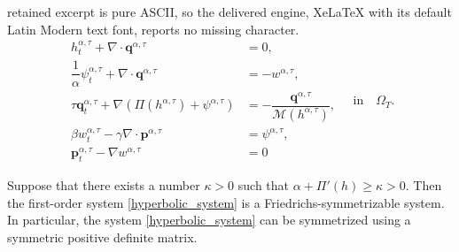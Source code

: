 \documentclass[10pt,a4paper]{amsart}
\newcommand{\rel}{^{\alpha, \tau}}
\begin{document}
retained excerpt is pure ASCII, so the delivered engine, XeLaTeX with its default Latin Modern text font, reports no missing character.
\begin{equation}\label{hyperbolic_system}
\begin{aligned}
     h^{\alpha, \tau}_t+\nabla\cdot \mathbf{q}^{\alpha, \tau}&=0,\\
     \dfrac{1}{\alpha}\psi^{\alpha, \tau}_t+\nabla\cdot \mathbf{q}^{\alpha, \tau}&=-w\rel,\\
     \tau\mathbf{q}^{\alpha, \tau}_t+\nabla(\Pi(h^{\alpha, \tau})+\psi^{\alpha, \tau})&=-\dfrac{\mathbf{q}^{\alpha, \tau}}{\mathcal{M}(h^{\alpha, \tau})},\\
    \beta w^{\alpha, \tau}_t-\gamma \nabla\cdot \mathbf{p}^{\alpha, \tau}&=\psi^{\alpha, \tau},\\
    \mathbf{p}^{\alpha, \tau}_t-\nabla w^{\alpha, \tau}&=0
\end{aligned} \quad \mathrm{in}\quad \Omega_T.
\end{equation}

\begin{lemma}\label{symmetrizer}
Suppose that there exists a number
\(\kappa>0\) such that $\alpha+\Pi'(h)\geq \kappa>0$. Then the first-order system \eqref{hyperbolic_system} is a Friedrichs-symmetrizable system. In particular, the system \eqref{hyperbolic_system} can be symmetrized using a symmetric positive definite matrix.
\end{lemma}
\end{document}
